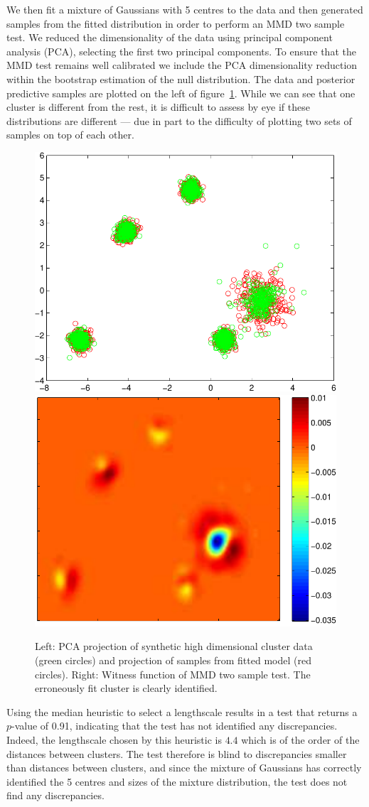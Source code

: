 \documentclass{article} %
\begin{document}
We then fit a mixture of Gaussians with 5 centres to the data and then generated samples from the fitted distribution in order to perform an MMD two sample test.
We reduced the dimensionality of the data using principal component analysis (PCA), selecting the first two principal components.
To ensure that the MMD test remains well calibrated we include the PCA dimensionality reduction within the bootstrap estimation of the null distribution.
The data and posterior predictive samples are plotted on the left of figure~\ref{fig:high_mog}.
While we can see that one cluster is different from the rest, it is difficult to assess by eye if these distributions are different --- due in part to the difficulty of plotting two sets of samples on top of each other.

\begin{figure}[ht]
\centering
\includegraphics[width=0.3\columnwidth]{figures/high_mog_pca}
\hspace{0.1\columnwidth}
\includegraphics[width=0.31\columnwidth]{figures/high_mog_witness}
\caption{
Left: PCA projection of synthetic high dimensional cluster data (green circles) and projection of samples from fitted model (red circles).
Right: Witness function of MMD two sample test. The erroneously fit cluster is clearly identified.
}
\label{fig:high_mog}
\end{figure}

Using the median heuristic to select a lengthscale results in a test that returns a $p$-value of 0.91, indicating that the test has not identified any discrepancies.
Indeed, the lengthscale chosen by this heuristic is $4.4$ which is of the order of the distances between clusters.
The test therefore is blind to discrepancies smaller than distances between clusters\footnotemark, and since the mixture of Gaussians has correctly identified the 5 centres and sizes of the mixture distribution, the test does not find any discrepancies.
\end{document}

